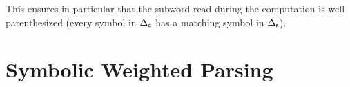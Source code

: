 %
%
This ensures in particular that the subword
read during the computation is well parenthesized
(every symbol in ${\Delta_\mathsf{c}}$ has a matching symbol in ${\Delta_\mathsf{r}}$).




%





\section{Symbolic Weighted Parsing}
\label{sec:parsing}

